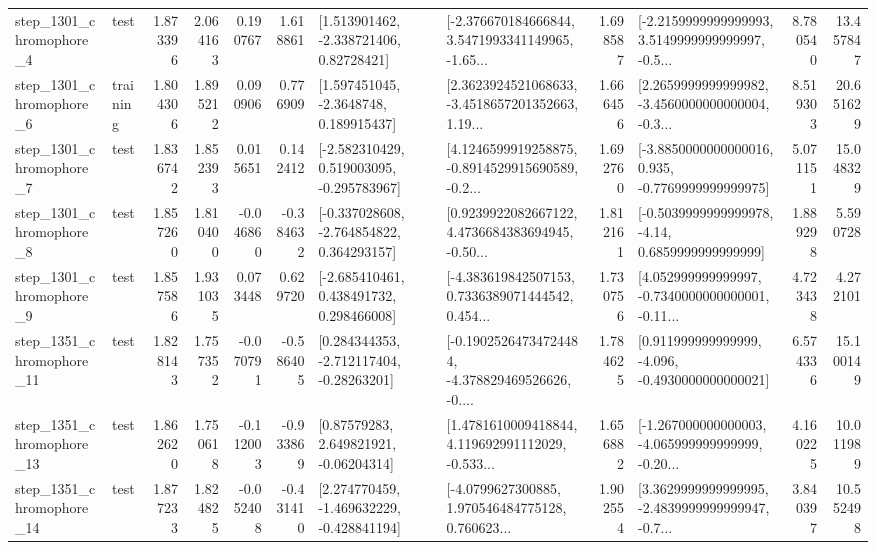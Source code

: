 \begin{tabular}{llrrrrllrlrr}
  step\_1301\_chromophore\_4 &      test &      1.873396 &    2.064163 &      0.190767 &  1.618861 &     [1.513901462, -2.338721406, 0.82728421] &  [-2.376670184666844, 3.5471993341149965, -1.65... &       1.698587 &  [-2.2159999999999993, 3.5149999999999997, -0.5... &            8.780540 &         13.457847 \\
  step\_1301\_chromophore\_6 &  training &      1.804306 &    1.895212 &      0.090906 &  0.776909 &      [1.597451045, -2.3648748, 0.189915437] &  [2.3623924521068633, -3.4518657201352663, 1.19... &       1.666456 &  [2.2659999999999982, -3.4560000000000004, -0.3... &            8.519303 &         20.651629 \\
  step\_1301\_chromophore\_7 &      test &      1.836742 &    1.852393 &      0.015651 &  0.142412 &   [-2.582310429, 0.519003095, -0.295783967] &  [4.1246599919258875, -0.8914529915690589, -0.2... &       1.692760 &  [-3.8850000000000016, 0.935, -0.7769999999999975] &            5.071151 &         15.048329 \\
  step\_1301\_chromophore\_8 &      test &      1.857260 &    1.810400 &     -0.046860 & -0.384632 &   [-0.337028608, -2.764854822, 0.364293157] &  [0.9239922082667122, 4.4736684383694945, -0.50... &       1.812161 &   [-0.5039999999999978, -4.14, 0.6859999999999999] &            1.889298 &          5.590728 \\
  step\_1301\_chromophore\_9 &      test &      1.857586 &    1.931035 &      0.073448 &  0.629720 &    [-2.685410461, 0.438491732, 0.298466008] &  [-4.383619842507153, 0.7336389071444542, 0.454... &       1.730756 &  [4.052999999999997, -0.7340000000000001, -0.11... &            4.723438 &          4.272101 \\
 step\_1351\_chromophore\_11 &      test &      1.828143 &    1.757352 &     -0.070791 & -0.586405 &    [0.284344353, -2.712117404, -0.28263201] &  [-0.19025264734724484, -4.378829469526626, -0.... &       1.784625 &   [0.911999999999999, -4.096, -0.4930000000000021] &            6.574336 &         15.100149 \\
 step\_1351\_chromophore\_13 &      test &      1.862620 &    1.750618 &     -0.112003 & -0.933869 &      [0.87579283, 2.649821921, -0.06204314] &  [1.4781610009418844, 4.119692991112029, -0.533... &       1.656882 &  [-1.267000000000003, -4.065999999999999, -0.20... &            4.160225 &         10.011989 \\
 step\_1351\_chromophore\_14 &      test &      1.877233 &    1.824825 &     -0.052408 & -0.431410 &   [2.274770459, -1.469632229, -0.428841194] &  [-4.0799627300885, 1.970546484775128, 0.760623... &       1.902554 &  [3.3629999999999995, -2.4839999999999947, -0.7... &            3.840397 &         10.552498 \\

\end{tabular}
